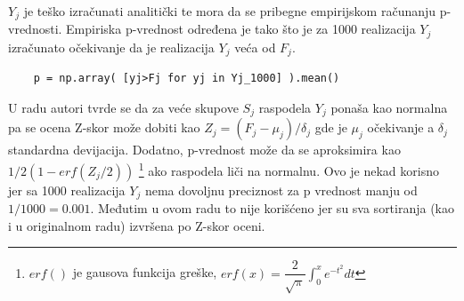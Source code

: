 $Y_j$ je teško izračunati analitički te mora da se pribegne empirijskom
računanju p-vrednosti. Empiriska p-vrednost određena je tako što je za 1000
realizacija $Y_j$ izračunato očekivanje da je realizacija $Y_j$ veća od $F_j$.
\begin{verbatim}
    p = np.array( [yj>Fj for yj in Yj_1000] ).mean()
\end{verbatim}
U radu \parencite{Xie2007} autori tvrde se da za veće skupove $S_j$ raspodela
$Y_j$ ponaša kao normalna pa se ocena Z-skor može dobiti kao
$Z_j=(F_j-\mu_j)/\delta_j$ gde je $\mu_j$ očekivanje a $\delta_j$ standardna
devijacija.  Dodatno, p-vrednost može da se aproksimira kao $1/2(1-erf(Z_j/2))$
\footnote{$erf()$ je gausova funkcija greške,
$erf(x)=\dfrac{2}{\sqrt{\pi}} \int_{0}^{x}  e^{-t^2} dt$ }
ako raspodela liči na normalnu. Ovo je nekad korisno jer sa 1000 realizacija
$Y_j$ nema dovoljnu preciznost za p vrednost manju od $1/1000=0.001$. Međutim u
ovom radu to nije korišćeno jer su sva sortiranja (kao i u originalnom radu)
izvršena po Z-skor oceni.


